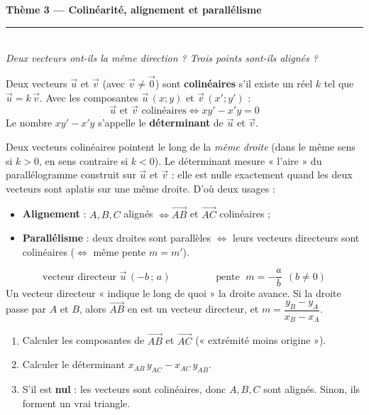 \documentclass[11pt,a4paper]{article}
\newcommand{\vc}[1]{\overrightarrow{#1}}
\begin{document}
\begin{center}
{\LARGE\bfseries\color{primarydark}Thème 3 — Colinéarité, alignement et parallélisme}\\[2pt]
{\color{primary}\rule{0.72\linewidth}{1.2pt}}\\[4pt]
{\small\itshape Deux vecteurs ont-ils la même direction ? Trois points sont-ils alignés ?}
\end{center}
\vspace{1mm}

\begin{rappel}
Deux vecteurs $\vec u$ et $\vec v$ (avec $\vec v\neq\vec0$) sont \textbf{colinéaires} s'il existe un réel
$k$ tel que $\vec u=k\,\vec v$. Avec les composantes $\vec u\,(x;y)$ et $\vec v\,(x';y')$ :
\[
  \boxed{\;\vec u \text{ et } \vec v \text{ colinéaires} \iff xy'-x'y=0\;}
\]
Le nombre $xy'-x'y$ s'appelle le \textbf{déterminant} de $\vec u$ et $\vec v$.
\end{rappel}

\begin{idee}[colinéaire = même direction = « parallèle »]
Deux vecteurs colinéaires pointent le long de la \emph{même droite} (dans le même sens si $k>0$,
en sens contraire si $k<0$). Le déterminant mesure « l'aire » du parallélogramme construit sur
$\vec u$ et $\vec v$ : elle est nulle exactement quand les deux vecteurs sont aplatis sur une même
droite. D'où deux usages :
\begin{itemize}[leftmargin=1.5em,topsep=2pt,itemsep=1pt]
  \item \textbf{Alignement} : $A,B,C$ alignés $\iff \vc{AB}$ et $\vc{AC}$ colinéaires ;
  \item \textbf{Parallélisme} : deux droites sont parallèles $\iff$ leurs vecteurs directeurs sont
        colinéaires ($\iff$ même pente $m=m'$).
\end{itemize}
\end{idee}

\begin{rappel}[vecteur directeur et pente d'une droite $ax+by+c=0$]
\[
  \boxed{\;\text{vecteur directeur }\vec u\,(-b\,;\,a)\;}\qquad\qquad
  \boxed{\;\text{pente }\;m=-\dfrac{a}{b}\ \ (b\neq0)\;}
\]
Un vecteur directeur « indique le long de quoi » la droite avance. Si la droite passe par $A$ et $B$,
alors $\vc{AB}$ en est un vecteur directeur, et $m=\dfrac{y_B-y_A}{x_B-x_A}$.
\end{rappel}

\begin{methode}
\begin{enumerate}[leftmargin=1.7em,topsep=2pt,itemsep=2pt]
  \item Calculer les composantes de $\vc{AB}$ et $\vc{AC}$ (« extrémité moins origine »).
  \item Calculer le déterminant $x_{AB}\,y_{AC}-x_{AC}\,y_{AB}$.
  \item S'il est \textbf{nul} : les vecteurs sont colinéaires, donc $A,B,C$ sont alignés.
        Sinon, ils forment un vrai triangle.
\end{enumerate}
\end{methode}
\end{document}
